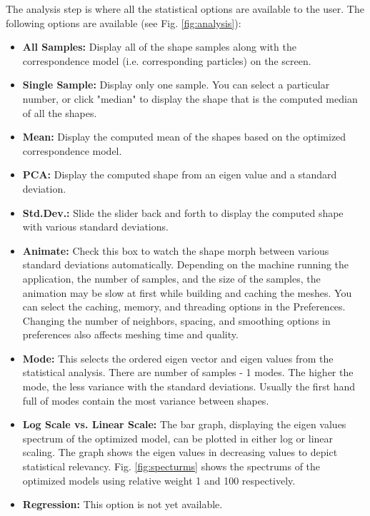 \documentclass[letterpaper,12pt]{article}   %
\begin{document}
The analysis step is where all the statistical options are available to the user. The following options are available (see Fig. \ref{fig:analysis}):

\begin{itemize}
\item \textbf{All Samples:} Display all of the shape samples along with the correspondence model (i.e. corresponding particles) on the screen.
\item \textbf{Single Sample:} Display only one sample. You can select a particular number, or click "median" to display the shape that is the computed median of all the shapes.
\item \textbf{Mean:} Display the computed mean of the shapes based on the optimized correspondence model.
\item \textbf{PCA:} Display the computed shape from an eigen value and a standard deviation.
\item \textbf{Std.Dev.:} Slide the slider back and forth to display the computed shape with various standard deviations.
\item \textbf{Animate:} Check this box to watch the shape morph between various standard deviations automatically. Depending on the machine running the application, the number of samples, and the size of the samples, the animation may be slow at first while building and caching the meshes. You can select the caching, memory, and threading options in the Preferences. Changing the number of neighbors, spacing, and smoothing options in preferences also affects meshing time and quality.
\end{itemize}

\endgroup


\begin{itemize}
\item \textbf{Mode:} This selects the ordered eigen vector and eigen values from the statistical analysis. There are number of samples - 1 modes. The higher the mode, the less variance with the standard deviations. Usually the first hand full of modes contain the most variance between shapes.

\item \textbf{Log Scale vs. Linear Scale:} The bar graph, displaying the eigen values spectrum of the optimized model, can be plotted in either log or linear scaling. The graph shows the eigen values in decreasing values to depict statistical relevancy. Fig. \ref{fig:specturms} shows the spectrums of the optimized models using relative weight 1 and 100 respectively. 

\item \textbf{Regression:} This option is not yet available.

\end{itemize}
\end{document}

